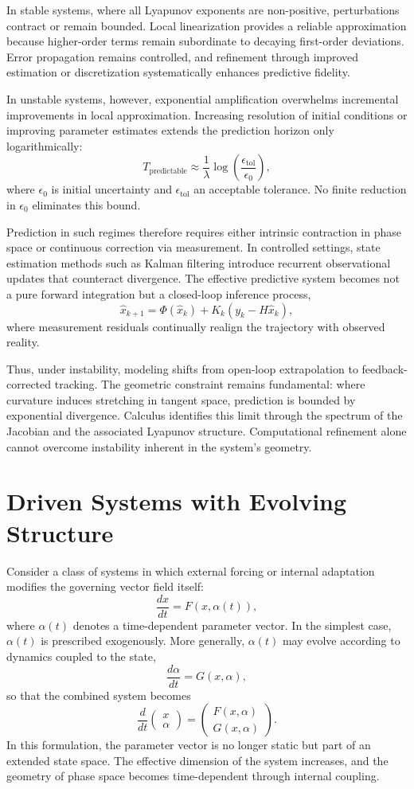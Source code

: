 \documentclass[12pt]{book}
\begin{document}
In stable systems, where all Lyapunov exponents are non-positive, perturbations contract or remain bounded. Local linearization provides a reliable approximation because higher-order terms remain subordinate to decaying first-order deviations. Error propagation remains controlled, and refinement through improved estimation or discretization systematically enhances predictive fidelity.

In unstable systems, however, exponential amplification overwhelms incremental improvements in local approximation. Increasing resolution of initial conditions or improving parameter estimates extends the prediction horizon only logarithmically:
\[
T_{\text{predictable}} \approx \frac{1}{\lambda} \log\!\left(\frac{\epsilon_{\text{tol}}}{\epsilon_0}\right),
\]
where $\epsilon_0$ is initial uncertainty and $\epsilon_{\text{tol}}$ an acceptable tolerance. No finite reduction in $\epsilon_0$ eliminates this bound.

Prediction in such regimes therefore requires either intrinsic contraction in phase space or continuous correction via measurement. In controlled settings, state estimation methods such as Kalman filtering introduce recurrent observational updates that counteract divergence. The effective predictive system becomes not a pure forward integration but a closed-loop inference process,
\[
\widehat{x}_{k+1} = \Phi(\widehat{x}_k) + K_k (y_k - H \widehat{x}_k),
\]
where measurement residuals continually realign the trajectory with observed reality.

Thus, under instability, modeling shifts from open-loop extrapolation to feedback-corrected tracking. The geometric constraint remains fundamental: where curvature induces stretching in tangent space, prediction is bounded by exponential divergence. Calculus identifies this limit through the spectrum of the Jacobian and the associated Lyapunov structure. Computational refinement alone cannot overcome instability inherent in the system's geometry.

\section{Driven Systems with Evolving Structure}

Consider a class of systems in which external forcing or internal adaptation modifies the governing vector field itself:
\[
\frac{dx}{dt} = F(x, \alpha(t)),
\]
where $\alpha(t)$ denotes a time-dependent parameter vector. In the simplest case, $\alpha(t)$ is prescribed exogenously. More generally, $\alpha(t)$ may evolve according to dynamics coupled to the state,
\[
\frac{d\alpha}{dt} = G(x,\alpha),
\]
so that the combined system becomes
\[
\frac{d}{dt}
\begin{pmatrix}
x \\
\alpha
\end{pmatrix}
=
\begin{pmatrix}
F(x,\alpha) \\
G(x,\alpha)
\end{pmatrix}.
\]
In this formulation, the parameter vector is no longer static but part of an extended state space. The effective dimension of the system increases, and the geometry of phase space becomes time-dependent through internal coupling.
\end{document}
